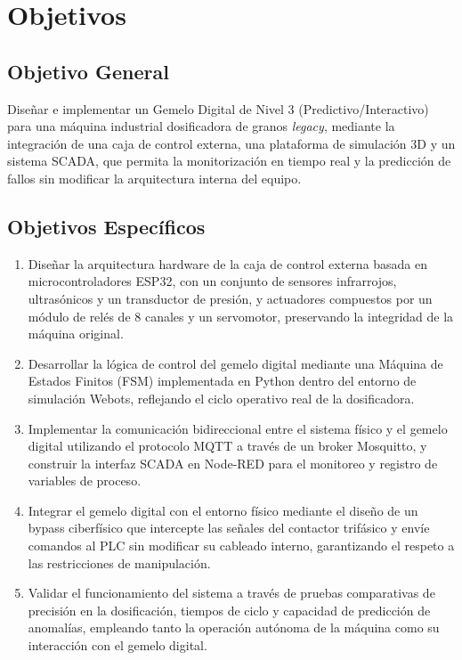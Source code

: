 \section{Objetivos}
\subsection{Objetivo General}
Diseñar e implementar un Gemelo Digital de Nivel 3 (Predictivo/Interactivo) para una máquina industrial dosificadora de granos \textit{legacy}, mediante la integración de una caja de control externa, una plataforma de simulación 3D y un sistema SCADA, que permita la monitorización en tiempo real y la predicción de fallos sin modificar la arquitectura interna del equipo.

\subsection{Objetivos Específicos}
\begin{enumerate}
    \item Diseñar la arquitectura hardware de la caja de control externa basada en microcontroladores ESP32, con un conjunto de sensores infrarrojos, ultrasónicos y un transductor de presión, y actuadores compuestos por un módulo de relés de 8 canales y un servomotor, preservando la integridad de la máquina original.
    \item Desarrollar la lógica de control del gemelo digital mediante una Máquina de Estados Finitos (FSM) implementada en Python dentro del entorno de simulación Webots, reflejando el ciclo operativo real de la dosificadora.
    \item Implementar la comunicación bidireccional entre el sistema físico y el gemelo digital utilizando el protocolo MQTT a través de un broker Mosquitto, y construir la interfaz SCADA en Node-RED para el monitoreo y registro de variables de proceso.
    \item Integrar el gemelo digital con el entorno físico mediante el diseño de un bypass ciberfísico que intercepte las señales del contactor trifásico y envíe comandos al PLC sin modificar su cableado interno, garantizando el respeto a las restricciones de manipulación.
    \item Validar el funcionamiento del sistema a través de pruebas comparativas de precisión en la dosificación, tiempos de ciclo y capacidad de predicción de anomalías, empleando tanto la operación autónoma de la máquina como su interacción con el gemelo digital.
\end{enumerate}

